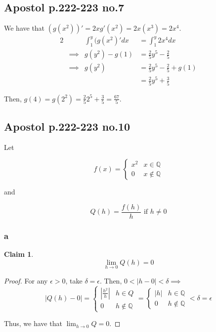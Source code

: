 \documentclass[12pt,letterpaper]{article}
\theoremstyle{definition}
\newtheorem*{claim}{Claim}
\newcommand{\Q}{\mathbb{Q}}
\begin{document}
\subsection*{Apostol p.222-223 no.7}

We have that $(g(x^2))' = 2xg'(x^2) = 2x(x^3) = 2x^4$.
\begin{alignat*}{2}
  && \int_1^y(g(x^2)'dx &= \int_1^y2x^4dx \\
  &\implies& g(y^2) - g(1) &= \frac{2}{5}y^5 - \frac{2}{5} \\
  &\implies& g(y^2) &= \frac{2}{5}y^5 - \frac{2}{5} + g(1) \\
  && &= \frac{2}{5}y^5 + \frac{3}{5}
\end{alignat*}

Then, $g(4) = g(2^2) = \frac{2}{5}2^5 + \frac{3}{5} = \frac{67}{5}$.

\subsection*{Apostol p.222-223 no.10}

Let

\[
  f(x) = \begin{cases}
    x^2 & x \in \Q \\
    0 & x \notin \Q
  \end{cases}
\]

and

\[
  Q(h) = \frac{f(h)}{h} \text{ if } h \neq 0
\]

\subsubsection*{a}

\begin{claim}
  \[
    \lim_{h\rightarrow 0}Q(h) = 0
  \]
\end{claim}

\begin{proof}
  For any $\epsilon > 0$, take $\delta = \epsilon$. Then, $0 < |h - 0| < \delta
  \implies$
  \[
    |Q(h) - 0| = \begin{cases}
      |\frac{h^2}{h}| & h \in Q \\
      0 & h \notin \Q
    \end{cases} = \begin{cases}
      |h| & h \in \Q \\
      0 & h \notin \Q
    \end{cases} < \delta = \epsilon
  \]

  Thus, we have that $\lim_{h\rightarrow 0} Q = 0$.
\end{proof}
\end{document}
